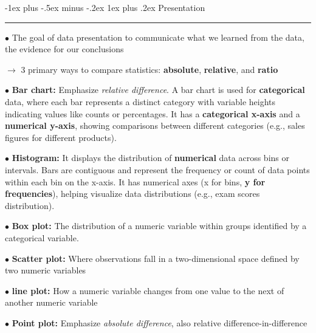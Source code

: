 \documentclass[letterpaper, 10.5pt,landscape]{article}
\makeatletter
\renewcommand{\subsubsection}{\@startsection{subsubsection}{3}{0mm}%
                                {-1ex plus -.5ex minus -.2ex}%
                                {1ex plus .2ex}%
                                {\normalfont\small\bfseries}}
\makeatother
\begin{document}
\begin{multicols*}{3}
\vspace{5pt}

\subsubsection{Presentation} {\color{teal}\hrule height 0.5pt} \smallskip
$\bullet$ The goal of data presentation to communicate what we learned from the data, the evidence for our conclusions\\

\vspace{2pt}


$\rightarrow$ 3 primary ways to compare statistics: \textbf{absolute}, \textbf{relative}, and \textbf{ratio} \\
\vspace{2pt}

$\bullet$ \textbf{Bar chart: } Emphasize \textit{relative difference}. A bar chart is used for \textbf{categorical} data, where each bar represents a distinct category with variable heights indicating values like counts or percentages. It has a \textbf{categorical x-axis} and a \textbf{numerical y-axis}, showing comparisons between different categories (e.g., sales figures for different products).


$\bullet$ \textbf{Histogram: } It displays the distribution of \textbf{numerical} data across bins or intervals. Bars are contiguous and represent the frequency or count of data points within each bin on the x-axis. It has numerical axes (x for bins, \textbf{y for frequencies}), helping visualize data distributions (e.g., exam scores distribution).
\vspace{2pt}


$\bullet$ \textbf{Box plot: }The distribution of a numeric variable within groups identified by a categorical variable. \\
\vspace{2pt}

$\bullet$ \textbf{Scatter plot: } Where observations fall in a two-dimensional space defined by two numeric variables \\
\vspace{2pt}

$\bullet$ \textbf{line plot: } How a numeric variable changes from one value to the next of another numeric variable \\
\vspace{2pt}


$\bullet$ \textbf{Point plot: } Emphasize \textit{absolute difference}, also relative difference-in-difference \\
\vspace{2pt}





\end{multicols*}
\end{document}
